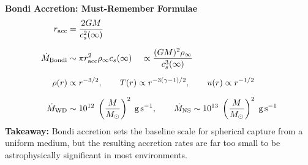 \begin{bigidea}
\textbf{Bondi Accretion: Must-Remember Formulae}
\begin{align*}
r_{\rm acc} &= \frac{2GM}{c_s^2(\infty)} \\[6pt]
\dot{M}_{\rm Bondi} &\sim \pi r_{\rm acc}^2 \rho_\infty c_s(\infty) \;\;\;\; \propto \frac{(GM)^2 \rho_\infty}{c_s^3(\infty)} \\[6pt]
\rho(r) &\propto r^{-3/2}, \qquad T(r) \propto r^{-3(\gamma-1)/2}, \qquad u(r) \propto r^{-1/2} \\[6pt]
\dot{M}_{\rm WD} &\sim 10^{12} \;\left(\frac{M}{M_\odot}\right)^2\;{\rm g\,s^{-1}}, \qquad
\dot{M}_{\rm NS} \sim 10^{13} \;\left(\frac{M}{M_\odot}\right)^2\;{\rm g\,s^{-1}}
\end{align*}
\textbf{Takeaway:} Bondi accretion sets the baseline scale for spherical capture from a uniform medium, but the resulting accretion rates are far too small to be astrophysically significant in most environments.
\end{bigidea}